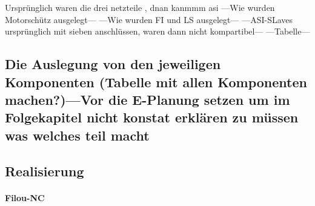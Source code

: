    Ursprünglich waren die drei netzteile , dnan kanmmm asi
    ---Wie wurden Motorschütz ausgelegt---
    ---Wie wurden FI und LS ausgelegt---
    ---ASI-SLaves ursprünglich mit sieben anschlüssen, waren dann nicht kompartibel---
    ---Tabelle--- 
\subsection{Die Auslegung von den jeweiligen Komponenten (Tabelle mit allen Komponenten machen?)---Vor die E-Planung setzen um im Folgekapitel nicht konstat erklären zu müssen was welches teil macht}
\subsection{Realisierung}
    \paragraph{Filou-NC}\mbox{}\\





